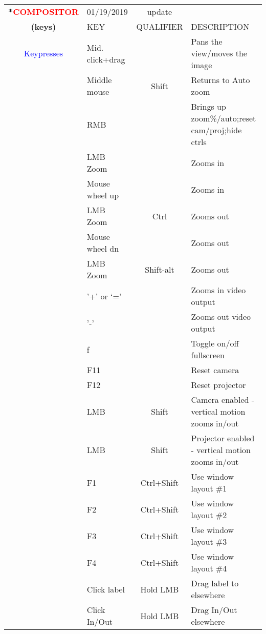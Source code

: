 \begin{center}
    \small 
    \begin{longtable}{ >{\bfseries}c l c p{6cm}}             
        \toprule
        \multirow{2}*{\textcolor{red}{COMPOSITOR}} & 01/19/2019 & update & \\
        \noalign{\smallskip}
        \cline{2-4}
        \noalign{\smallskip}
        (keys) & KEY & QUALIFIER & DESCRIPTION\\
        \midrule        
        \endhead   
        
        \textcolor{blue}{Keypresses} & Mid. click+drag &  & Pans the view/moves the image \\        
        & Middle mouse & Shift & Returns to Auto zoom \\        
        & RMB &  & Brings up zoom\%/auto;reset cam/proj;hide ctrls \\        
        & LMB Zoom &  & Zooms in \\        
        & Mouse wheel up &  & Zooms in \\        
        & LMB Zoom & Ctrl & Zooms out \\        
        & Mouse wheel dn &  & Zooms out \\        
        & LMB Zoom & Shift-alt & Zooms out  \\        
        & '+' or ‘=’ &  & Zooms in video output \\        
        & '-' &  & Zooms out video output \\        
        & f &  & Toggle on/off fullscreen \\        
        & F11 &  & Reset camera \\        
        & F12 &  & Reset projector \\        
        & LMB & Shift & Camera enabled - vertical motion zooms in/out\\        
        & LMB & Shift & Projector enabled - vertical motion zooms in/out\\        
        & F1 & Ctrl+Shift & Use window layout \#1 \\        
        & F2 & Ctrl+Shift & Use window layout \#2 \\        
        & F3 & Ctrl+Shift & Use window layout \#3 \\        
        & F4 & Ctrl+Shift & Use window layout \#4 \\        
        & Click label & Hold LMB & Drag label to elsewhere \\        
        & Click In/Out & Hold LMB & Drag In/Out elsewhere \\

\end{longtable}
\end{center}
